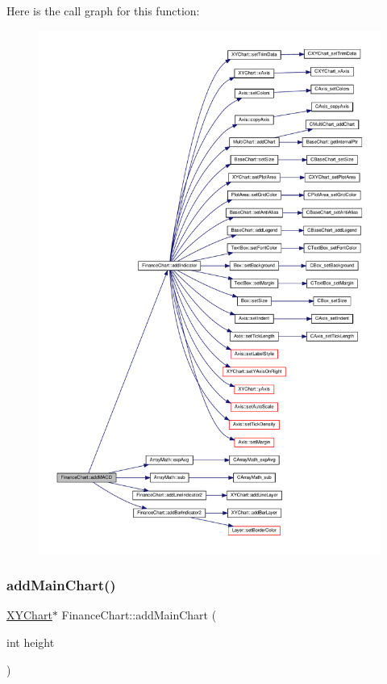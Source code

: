 Here is the call graph for this function\+:
\nopagebreak
\begin{figure}[H]
\begin{center}
\leavevmode
\includegraphics[width=350pt]{class_finance_chart_a3f46f24c67ed7a2c4a5ffa77fbe7ba73_cgraph}
\end{center}
\end{figure}
\mbox{\label{class_finance_chart_a69ac5aca5d2d232184398b43fee6eb13}} 
\subsubsection{\texorpdfstring{add\+Main\+Chart()}{addMainChart()}}
{\footnotesize\ttfamily \hyperlink{class_x_y_chart}{X\+Y\+Chart}$\ast$ Finance\+Chart\+::add\+Main\+Chart (\begin{DoxyParamCaption}\item[{int}]{height }\end{DoxyParamCaption})\hspace{0.3cm}{\ttfamily [inline]}}



